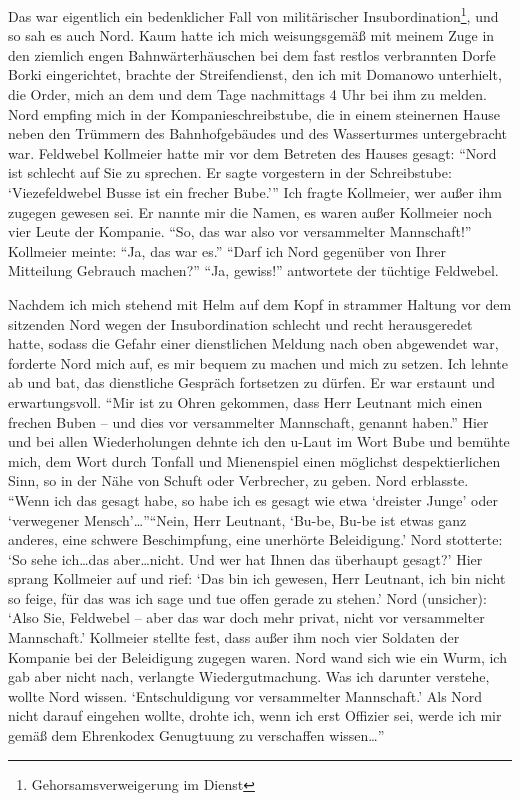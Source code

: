 Das war eigentlich ein bedenklicher Fall von militärischer Insubordination\footnote{Gehorsamsverweigerung im Dienst}, und so sah es auch Nord. Kaum hatte ich mich weisungsgemäß mit meinem Zuge in den ziemlich engen Bahnwärterhäuschen bei dem fast restlos verbrannten Dorfe Borki eingerichtet, brachte der Streifendienst, den ich mit Domanowo unterhielt, die Order, mich an dem und dem Tage nachmittags 4 Uhr bei ihm zu melden. Nord empfing mich in der Kompanieschreibstube, die in einem steinernen Hause neben den Trümmern des Bahnhofgebäudes und des Wasserturmes untergebracht war. Feldwebel Kollmeier hatte mir vor dem Betreten des Hauses gesagt: \enquote{Nord ist schlecht auf Sie zu sprechen. Er sagte vorgestern in der Schreibstube: \enquote{Viezefeldwebel Busse ist ein frecher Bube.}} Ich fragte Kollmeier, wer außer ihm zugegen gewesen sei. Er nannte mir die Namen, es waren außer Kollmeier noch vier Leute der Kompanie. \enquote{So, das war also vor versammelter Mannschaft!} Kollmeier meinte: \enquote{Ja, das war es.} \enquote{Darf ich Nord gegenüber von Ihrer Mitteilung Gebrauch machen?} \enquote{Ja, gewiss!} antwortete der tüchtige Feldwebel.

Nachdem ich mich stehend mit Helm auf dem Kopf in strammer Haltung vor dem sitzenden Nord wegen der Insubordination schlecht und recht herausgeredet hatte, sodass die Gefahr einer dienstlichen Meldung nach oben abgewendet war, forderte Nord mich auf, es mir bequem zu machen und mich zu setzen. Ich lehnte ab und bat, das dienstliche Gespräch fortsetzen zu dürfen. Er war erstaunt und erwartungsvoll. \enquote{Mir ist zu Ohren gekommen, dass Herr Leutnant mich einen frechen Buben -- und dies vor versammelter Mannschaft, genannt haben.} Hier und bei allen Wiederholungen dehnte ich den u-Laut im Wort Bube und bemühte mich, dem Wort durch Tonfall und Mienenspiel einen möglichst despektierlichen Sinn, so in der Nähe von Schuft oder Verbrecher, zu geben. Nord erblasste. \enquote{Wenn ich das gesagt habe, so habe ich es gesagt wie etwa \enquote{dreister Junge} oder \enquote{verwegener Mensch}\dots}\enquote{Nein, Herr Leutnant, \enquote{Bu-be, Bu-be ist etwas ganz anderes, eine schwere Beschimpfung, eine unerhörte Beleidigung.} Nord stotterte: \enquote{So sehe ich\dots das aber\dots nicht. Und wer hat Ihnen das überhaupt gesagt?} Hier sprang Kollmeier auf und rief: \enquote{Das bin ich gewesen, Herr Leutnant, ich bin nicht so feige, für das was ich sage und tue offen gerade zu stehen.} Nord (unsicher): \enquote{Also Sie, Feldwebel -- aber das war doch mehr privat, nicht vor versammelter Mannschaft.} Kollmeier stellte fest, dass außer ihm noch vier Soldaten der Kompanie bei der Beleidigung zugegen waren. Nord wand sich wie ein Wurm, ich gab aber nicht nach, verlangte Wiedergutmachung. Was ich darunter verstehe, wollte Nord wissen. \enquote{Entschuldigung vor versammelter Mannschaft.} Als Nord nicht darauf eingehen wollte, drohte ich, wenn ich erst Offizier sei, werde ich mir gemäß dem Ehrenkodex Genugtuung zu verschaffen wissen\dots}

